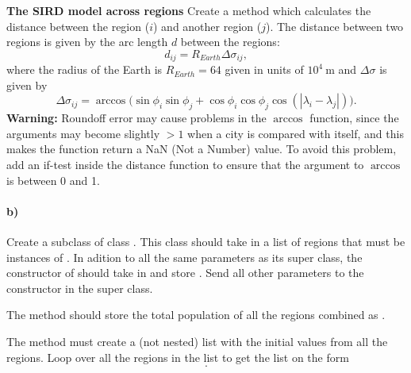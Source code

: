 \begin{Problem}{\textbf{The SIRD model across regions}}
Create a method  which calculates the distance between the  region ($i$) and another region ($j$). The distance between two regions is given by the arc length $d$ between the regions:
\begin{equation*}
    d_{i j} = R_{Earth} \Delta \sigma_{i j} ,
\end{equation*}
where the radius of the Earth is $R_{Earth} = 64$ given in units of $10^4 \ \mathrm{m}$ and $\Delta \sigma$ is given by
\begin{equation*}
    \Delta \sigma_{i j} = \arccos \big( 
        \sin \phi_i \sin \phi_j 
        +  \cos \phi_i \cos \phi_j
        \cos \left( 
                |\lambda_i - \lambda_j |
        \right)
    \big)  .
\end{equation*}
{\bf Warning:} Roundoff error may cause problems in the $\arccos$ function, since the arguments may become slightly $>1$ when a city is compared with itself, and this makes the function return a
NaN (Not a Number) value. To avoid this problem, add an if-test inside the distance function to 
ensure that the argument to $\arccos$ is between 0 and 1.

\paragraph{b)}
Create a subclass  of class . This class should take in a list of regions that must be instances of . In adition to all the same parameters as its super class, the constructor of   should take in and store . Send all other parameters to the constructor in the super class.

The method  should store the total population of all the regions combined as . 

The method  must create a (not nested) list   with the initial values from all the regions. Loop over all the regions in the list  to get the list on the form 
\begin{equation*}
    [ S_1(0), I_1(0), R_1(0), D_1(0), S_2(0), I_2(0), R_2(0), D_2(0), ..., D_M(0) ] . 
\end{equation*}


\end{Problem}
